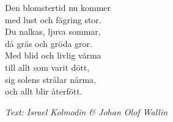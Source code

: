 \vspace{10pt}
Den blomstertid nu kommer\\
med lust och fägring stor.\\
Du nalkas, ljuva sommar,\\
då gräs och gröda gror.\\
Med blid och livlig värma\\
till allt som varit dött,\\
sig solens strålar närma,\\
och allt blir återfött.\par
\vspace{10pt}
{\footnotesize\textit{Text: Israel Kolmodin \& Johan Olof Wallin}}

